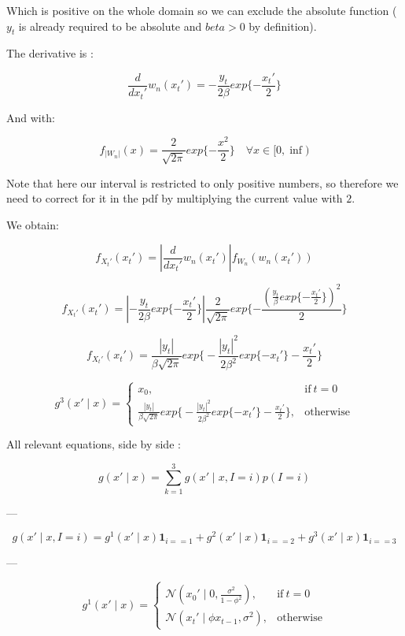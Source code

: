 \documentclass[]{article}
\begin{document}
Which is positive on the whole domain so we can exclude the absolute function ( $y_t$ is already required to be absolute and $beta>0$ by definition).


The derivative is :

$$ \frac{d}{d x_t'} w_n(x_t') = -\frac{y_t}{2\beta} exp \{ - \frac{x_t'}{2}\} $$

And with:

$$  f_{|W_n|}( x ) = \frac{2}{\sqrt{2 \pi}}  exp\{ -\frac{x^2}{2} \} \quad \forall x \in [0,\inf)$$

Note that here our interval is restricted to only positive numbers, so therefore we need to correct for it in the pdf by multiplying the current value with $2$.

We obtain:

$$ f_{X_t'}(x_t') = \left | \frac{d}{dx_t'} w_n(x_t') \right | f_{W_n}(w_n(x_t')) $$

$$ f_{X_t'}(x_t') = \left | -\frac{y_t}{2\beta} exp \{ - \frac{x_t'}{2}\} \right | \frac{2}{\sqrt{2 \pi}}  exp\{ -\frac{(\frac{y_t}{\beta} exp \{ - \frac{x_t'}{2}\})^2}{2} \} $$

$$ f_{X_t'}(x_t') = \frac{|y_t|}{\beta \sqrt{2 \pi}} exp \bigg\{ -\frac{|y_t|^2}{2 \beta^2} exp\{-x_t' \} - \frac{x_t'}{2} \bigg\} $$


\begin{equation}
g^3(x' \mid x)=
\begin{cases}
x_0, & \text{if}\ t=0 \\
\frac{|y_t|}{\beta \sqrt{2 \pi}} exp \bigg\{ -\frac{|y_t|^2}{2 \beta^2} exp\{-x_t' \} - \frac{x_t'}{2} \bigg\}, & \text{otherwise}
\end{cases}
\end{equation}

All relevant equations, side by side :

$$ g(x' \mid x) = \sum_{k=1}^3 g(x' \mid x, I=i) p(I=i) $$

---

$$ g(x' \mid x, I=i) = g^1(x' \mid x)  \mathbf{1}_{i==1} + g^2(x' \mid x)  \mathbf{1}_{i==2} + g^3(x' \mid x)  \mathbf{1}_{i==3}  $$

---

\begin{equation}
g^1(x' \mid x)=
\begin{cases}
\mathcal{N}(x_0' \mid 0, \frac{\sigma^2}{1-\phi^2}), & \text{if}\ t=0 \\
\mathcal{N}(x_t' \mid \phi x_{t-1}, \sigma^2) , & \text{otherwise}
\end{cases}
\end{equation}
\end{document}
